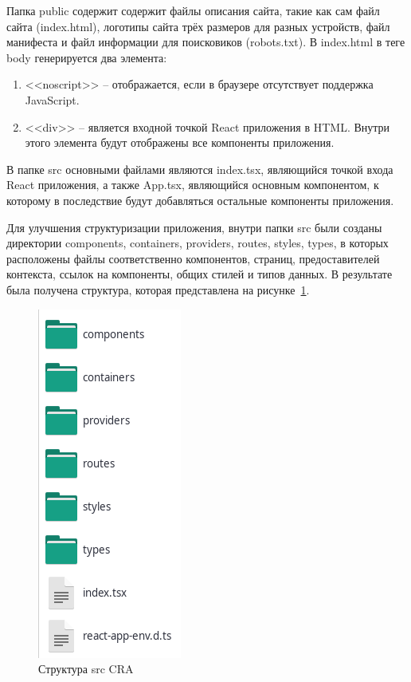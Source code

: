 Папка public содержит содержит файлы описания сайта, такие как сам файл сайта (index.html), логотипы сайта трёх размеров для разных устройств, файл манифеста и файл информации для поисковиков (robots.txt). В index.html в теге body генерируется два элемента:

\begin{enumerate}
  \item <<noscript>> -- отображается, если в браузере отсутствует поддержка JavaScript.
  \item <<div>> -- является входной точкой React приложения в HTML. Внутри этого элемента будут отображены все компоненты приложения.
\end{enumerate}

В папке src основными файлами являются index.tsx, являющийся точкой входа React приложения, а также App.tsx, являющийся основным компонентом, к которому в последствие будут добавляться остальные компоненты приложения.

Для улучшения структуризации приложения, внутри папки src были созданы директории components, containers, providers, routes, styles,  types, в которых расположены файлы соответственно компонентов, страниц, предоставителей контекста, ссылок на компоненты, общих стилей и типов данных. В результате была получена структура, которая представлена на рисунке~\ref{img:cre__struct}.

\begin{figure}[H]
  \centering
  \includegraphics[height=0.3\textheight]{assets/images/practical/cra__struct.png}
  \caption{Структура src CRA}
  \label{img:cre__struct}
\end{figure}

